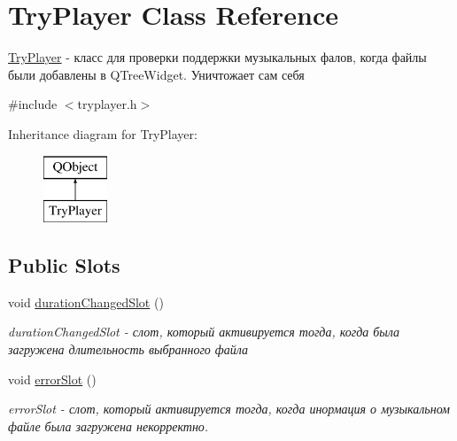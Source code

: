 \hypertarget{class_try_player}{}\section{Try\+Player Class Reference}
\label{class_try_player}


\hyperlink{class_try_player}{Try\+Player} -\/ класс для проверки поддержки музыкальных фалов, когда файлы были добавлены в Q\+Tree\+Widget. Уничтожает сам себя  




{\ttfamily \#include $<$tryplayer.\+h$>$}

Inheritance diagram for Try\+Player\+:\begin{figure}[H]
\begin{center}
\leavevmode
\includegraphics[height=2.000000cm]{class_try_player}
\end{center}
\end{figure}
\subsection*{Public Slots}
\begin{DoxyCompactItemize}
\item 
\mbox{\label{class_try_player_a67d1caa173bb754d46daaa03111f6d84}} 
void \hyperlink{class_try_player_a67d1caa173bb754d46daaa03111f6d84}{duration\+Changed\+Slot} ()
\begin{DoxyCompactList}\small\item\em duration\+Changed\+Slot -\/ слот, который активируется тогда, когда была загружена длительность выбранного файла \end{DoxyCompactList}\item 
\mbox{\label{class_try_player_ad4a2fdf909def192746ace6cc83cb1e1}} 
void \hyperlink{class_try_player_ad4a2fdf909def192746ace6cc83cb1e1}{error\+Slot} ()
\begin{DoxyCompactList}\small\item\em error\+Slot -\/ слот, который активируется тогда, когда инормация о музыкальном файле была загружена некорректно. \end{DoxyCompactList}\end{DoxyCompactItemize}
